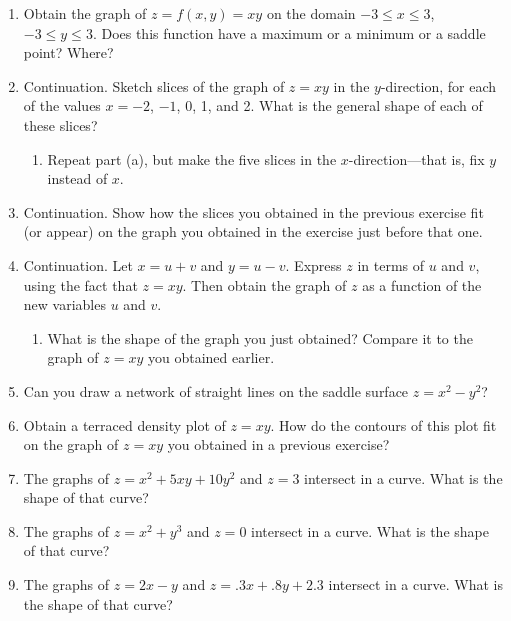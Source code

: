 \begin{enumerate}
  \begin{enumerate}
  \item What is the shape of the contours?  Indicate how the contours fit
on the graph.



\end{enumerate}
\item Obtain the graph of $z = f(x, y) = xy$ on the domain $-3 \leq x
\leq 3$, $-3 \leq y \leq 3$.  Does this function have a maximum or a
minimum or a saddle point?  Where?


\item Continuation.  Sketch slices of the graph of $z = xy$ in the
$y$-direction, for each of the values $x = -2$, $-1$, 0, 1, and 2.
What is the general shape of each of these slices?

  \begin{enumerate}
  \item Repeat part (a), but make the five slices in the
$x$-direction---that is, fix $y$ instead of $x$.


\end{enumerate}
\item Continuation.  Show how the slices you obtained in the previous
exercise fit (or appear) on the graph you obtained in the exercise
just before that one.


\item Continuation.  Let $x = u + v$ and $y = u - v$.  Express $z$ in
terms of $u$ and $v$, using the fact that $z = xy$.  Then obtain the
graph of $z$ as a function of the new variables $u$ and $v$.

  \begin{enumerate}
  \item What is the shape of the graph you just obtained?  Compare it to
the graph of $z = xy$ you obtained earlier.


\end{enumerate}
\item Can you draw a network of straight lines on the saddle surface $z
= x^2 - y^2$?


\item Obtain a terraced density plot of $z = xy$.  How do the contours
of this plot fit on the graph of $z = xy$ you obtained in a previous
exercise?


\item The graphs of $z = x^2 + 5 xy + 10 y^2$ and $z = 3$ intersect in
a curve.  What is the shape of that curve?


\item The graphs of $z = x^2 + y^3$ and $z = 0$ intersect in a curve.
What is the shape of that curve?


\item The graphs of $z = 2x - y$ and $z = .3 x + .8 y + 2.3$ intersect
in a curve.  What is the shape of that curve?


\end{enumerate}
